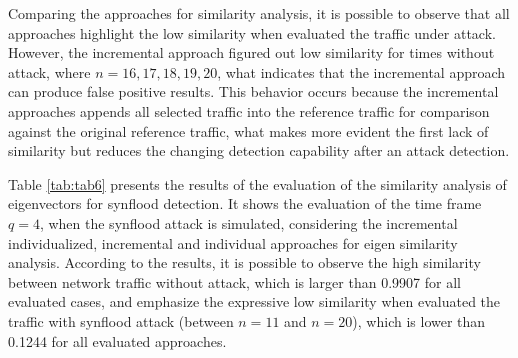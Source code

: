 Comparing the approaches for similarity analysis, it is possible to observe that all approaches highlight the low similarity when evaluated the traffic under attack. However, the incremental approach figured out low similarity for times without attack, where $n=16, 17, 18, 19, 20$, what indicates that the incremental approach can produce false positive results. This behavior occurs because the incremental approaches appends all selected traffic into the reference traffic for comparison against the original reference traffic, what makes more evident the first lack of similarity but reduces the changing detection capability after an attack detection.

Table \ref{tab:tab6} presents the results of the evaluation of the similarity analysis of eigenvectors for synflood detection. It shows the evaluation of the time frame $q=4$, when the synflood attack is simulated, considering the incremental individualized, incremental and individual approaches for eigen similarity analysis. According to the results, it is possible to observe the high similarity between network traffic without attack, which is larger than 0.9907 for all evaluated cases, and emphasize the expressive low similarity when evaluated the traffic with synflood attack (between $n=11$ and $n=20$), which is lower than 0.1244 for all evaluated approaches.

